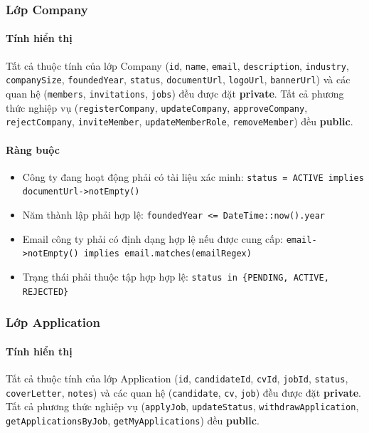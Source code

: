 \subsubsection{Lớp Company}

\paragraph{Tính hiển thị}
Tất cả thuộc tính của lớp Company (\texttt{id}, \texttt{name}, \texttt{email}, \texttt{description}, \texttt{industry}, \texttt{companySize}, \texttt{foundedYear}, \texttt{status}, \texttt{documentUrl}, \texttt{logoUrl}, \texttt{bannerUrl}) và các quan hệ (\texttt{members}, \texttt{invitations}, \texttt{jobs}) đều được đặt \textbf{private}. Tất cả phương thức nghiệp vụ (\texttt{registerCompany}, \texttt{updateCompany}, \texttt{approveCompany}, \texttt{rejectCompany}, \texttt{inviteMember}, \texttt{updateMemberRole}, \texttt{removeMember}) đều \textbf{public}.

\paragraph{Ràng buộc}
\begin{itemize}
    \item Công ty đang hoạt động phải có tài liệu xác minh: \texttt{status = ACTIVE implies documentUrl->notEmpty()}
    \item Năm thành lập phải hợp lệ: \texttt{foundedYear <= DateTime::now().year}
    \item Email công ty phải có định dạng hợp lệ nếu được cung cấp: \texttt{email->notEmpty() implies email.matches(emailRegex)}
    \item Trạng thái phải thuộc tập hợp hợp lệ: \texttt{status in \{PENDING, ACTIVE, REJECTED\}}
\end{itemize}

\subsubsection{Lớp Application}

\paragraph{Tính hiển thị}
Tất cả thuộc tính của lớp Application (\texttt{id}, \texttt{candidateId}, \texttt{cvId}, \texttt{jobId}, \texttt{status}, \texttt{coverLetter}, \texttt{notes}) và các quan hệ (\texttt{candidate}, \texttt{cv}, \texttt{job}) đều được đặt \textbf{private}. Tất cả phương thức nghiệp vụ (\texttt{applyJob}, \texttt{updateStatus}, \texttt{withdrawApplication}, \texttt{getApplicationsByJob}, \texttt{getMyApplications}) đều \textbf{public}.


